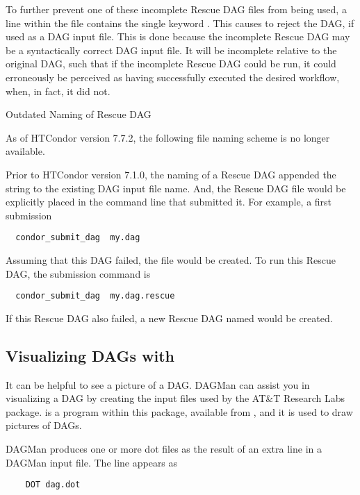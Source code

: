 To further prevent one of these incomplete Rescue DAG files from being used,
a line within the file contains the single keyword .
This causes  to reject the DAG, if used as a DAG input file.
This is done because the
incomplete Rescue DAG may be a syntactically correct DAG input file.
It will be incomplete relative to the original DAG,
such that if the incomplete Rescue DAG could be run,
it could erroneously be perceived as
having successfully executed the desired workflow, when, in fact,
it did not.

\begin{description}
\item[Outdated Naming of Rescue DAG]
\end{description}
As of HTCondor version 7.7.2, the following file naming scheme is 
no longer available.

Prior to HTCondor version 7.1.0, the naming of a Rescue DAG
appended the string  to the existing DAG input
file name. 
And, the Rescue DAG file would be explicitly placed in 
the command line that submitted it.
For example,  a first submission
\begin{verbatim}
  condor_submit_dag  my.dag
\end{verbatim}
Assuming that this DAG failed, the file 
would be created.
To run this Rescue DAG, the submission command is
\begin{verbatim}
  condor_submit_dag  my.dag.rescue
\end{verbatim}
If this Rescue DAG also failed, a new Rescue DAG named
 would be created.


\subsection{Visualizing DAGs with }

It can be helpful to see a picture of a DAG.
DAGMan can assist you in visualizing a DAG by creating
the input files used by the AT\&T Research Labs 
 package. 
 is a program within this package,
available from ,
and it is used to draw pictures of DAGs. 

DAGMan produces one or more dot files as the result of
an extra line
in a DAGMan input file. 
The line appears as
\begin{verbatim}
    DOT dag.dot
\end{verbatim}

